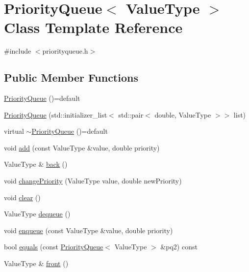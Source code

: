 \hypertarget{classPriorityQueue}{}\section{Priority\+Queue$<$ Value\+Type $>$ Class Template Reference}
\label{classPriorityQueue}


{\ttfamily \#include $<$priorityqueue.\+h$>$}

\subsection*{Public Member Functions}
\begin{DoxyCompactItemize}
\item 
\mbox{\hyperlink{classPriorityQueue_a6930969dba58cbd2b3326bb2b69a86bb}{Priority\+Queue}} ()=default
\item 
\mbox{\hyperlink{classPriorityQueue_a0959caf22cf508b3ffbe726d5bc701d1}{Priority\+Queue}} (std\+::initializer\+\_\+list$<$ std\+::pair$<$ double, Value\+Type $>$$>$ list)
\item 
virtual \mbox{\hyperlink{classPriorityQueue_afc663d44a2c1d9789bafb284407e6ee2}{$\sim$\+Priority\+Queue}} ()=default
\item 
void \mbox{\hyperlink{classPriorityQueue_aa604cec721b985421df5448c531a4482}{add}} (const Value\+Type \&value, double priority)
\item 
Value\+Type \& \mbox{\hyperlink{classPriorityQueue_a2bad145b40a82c36986f67610313658d}{back}} ()
\item 
void \mbox{\hyperlink{classPriorityQueue_a32f7f8d063a6cdc2cd726e994d8eae95}{change\+Priority}} (Value\+Type value, double new\+Priority)
\item 
void \mbox{\hyperlink{classPriorityQueue_ac8bb3912a3ce86b15842e79d0b421204}{clear}} ()
\item 
Value\+Type \mbox{\hyperlink{classPriorityQueue_aaee07e371e2370e76e6c42bada727ba2}{dequeue}} ()
\item 
void \mbox{\hyperlink{classPriorityQueue_a25b238c85272091d0662ad153abe058d}{enqueue}} (const Value\+Type \&value, double priority)
\item 
bool \mbox{\hyperlink{classPriorityQueue_aeb5957e78736d9b9cfed5e600166d5f0}{equals}} (const \mbox{\hyperlink{classPriorityQueue}{Priority\+Queue}}$<$ Value\+Type $>$ \&pq2) const
\item 
Value\+Type \& \mbox{\hyperlink{classPriorityQueue_a736a6bda35a26620407e175bee46ae4a}{front}} ()
$$
\end{DoxyCompactItemize}

